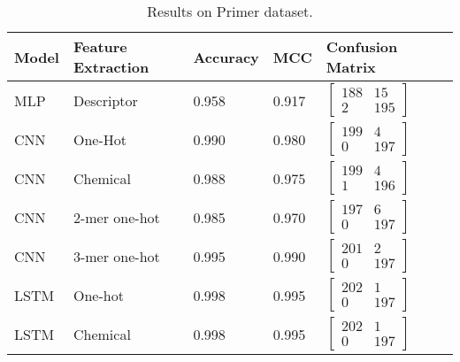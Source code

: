 \begin{longtable}{llllll}
	\caption{Results on Primer dataset.}
	\label{tab:primer_results}
    \endfirsthead
    \endhead
    
	\textbf{Model} & \textbf{Feature Extraction} & \textbf{Accuracy}  & \textbf{MCC} & \textbf{Confusion Matrix}\\\midrule
	
	MLP & Descriptor & 0.958 & 0.917 & 
	$\begin{bmatrix}
        188 & 15\\ 
        2 & 195
    \end{bmatrix}$
    \\\midrule


    CNN & One-Hot & 0.990 & 0.980 & 
	$\begin{bmatrix}
        199 & 4\\ 
        0 & 197
    \end{bmatrix}$
    \\

    CNN & Chemical & 0.988 & 0.975 & 
	$\begin{bmatrix}
        199 & 4\\ 
        1 & 196
    \end{bmatrix}$
    \\

    CNN & 2-mer one-hot & 0.985 & 0.970 & 
	$\begin{bmatrix}
        197 & 6\\ 
        0 & 197
    \end{bmatrix}$
    \\

    CNN & 3-mer one-hot & 0.995 & 0.990 & 
	$\begin{bmatrix}
        201 & 2\\ 
        0 & 197
    \end{bmatrix}$
    \\\midrule


    LSTM & One-hot & 0.998 & 0.995 & 
	$\begin{bmatrix}
        202 & 1\\ 
        0 & 197
    \end{bmatrix}$
    \\

    LSTM & Chemical & 0.998 & 0.995 & 
	$\begin{bmatrix}
        202 & 1\\ 
        0 & 197
    \end{bmatrix}$
    \\


\end{longtable}
